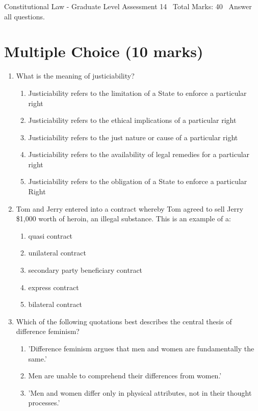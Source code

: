 \documentclass[12pt]{article}
\begin{document}
\begin{center}
Constitutional Law - Graduate Level Assessment 14 \
Total Marks: 40 \
Answer all questions.
\end{center}

\section*{Multiple Choice (10 marks)}
\begin{enumerate}[label=\arabic*.]
\item What is the meaning of justiciability?
\begin{enumerate}[label=(\alph*)]
    \item Justiciability refers to the limitation of a State to enforce a particular right
    \item Justiciability refers to the ethical implications of a particular right
    \item Justiciability refers to the just nature or cause of a particular right
    \item Justiciability refers to the availability of legal remedies for a particular right
    \item Justiciability refers to the obligation of a State to enforce a particular Right
\end{enumerate}
\item Tom and Jerry entered into a contract whereby Tom agreed to sell Jerry \$1,000 worth of heroin, an illegal substance. This is an example of a:
\begin{enumerate}[label=(\alph*)]
    \item quasi contract
    \item unilateral contract
    \item secondary party beneficiary contract
    \item express contract
    \item bilateral contract
\end{enumerate}
\item Which of the following quotations best describes the central thesis of difference feminism?
\begin{enumerate}[label=(\alph*)]
    \item 'Difference feminism argues that men and women are fundamentally the same.'
    \item Men are unable to comprehend their differences from women.'
    \item 'Men and women differ only in physical attributes, not in their thought processes.'

\end{enumerate}
\end{enumerate}
\end{document}
